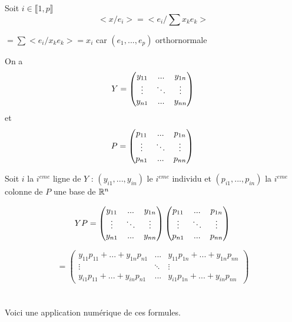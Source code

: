\documentclass{article}
\begin{document}
Soit $i \in \llbracket 1,p \rrbracket$ $$ <x/e_i> = <e_i / \sum x_ke_k >$$     \begin{center}
                                $= \sum <e_i/x_ke_k>= x_i$ car $(e_1,...,e_p)$ orthornormale\end{center}
On a\\
$$\\Y = \begin{pmatrix} y_{11} & ... & y_{1n}\\ \vdots & \ddots & \vdots\\  y_{n1} & ... & y_{nn}\end{pmatrix}$$ et $$P =  \begin{pmatrix} p_{11} & ... &p_{1n}\\ \vdots & \ddots & \vdots\\  p_{n1} & ... & p_{nn}\end{pmatrix}\\\\$$

Soit $i$ la $i^{eme}$ ligne de $Y$ : $(y_{i1},...,y_{in})$ le $i^{eme}$ individu et $(p_{i1},...,p_{in})$ la  $i^{eme}$ colonne de $P$ une base de $\mathbb{R}^n\\\\$

$$YP =\begin{pmatrix} y_{11} & ... & y_{1n}\\ \vdots & \ddots & \vdots\\  y_{n1} & ... & y_{nn}\end{pmatrix} \begin{pmatrix} p_{11} & ... &p_{1n}\\ \vdots & \ddots & \vdots\\  p_{n1} & ... & p_{nn}\end{pmatrix} \\ $$

$$ = \begin{pmatrix} y_{11}p_{11}+...+y_{1n}p_{n1} & ... & y_{11}p_{1n}+...+y_{1n}p_{nn}\\
\vdots & \ddots & \vdots\\
y_{i1}p_{11}+...+y_{in}p_{n1} & ... & y_{i1}p_{1n}+...+y_{in}p_{nn}\end{pmatrix}
$$
\\\\
Voici une application numérique de ces formules. 
\end{document}
